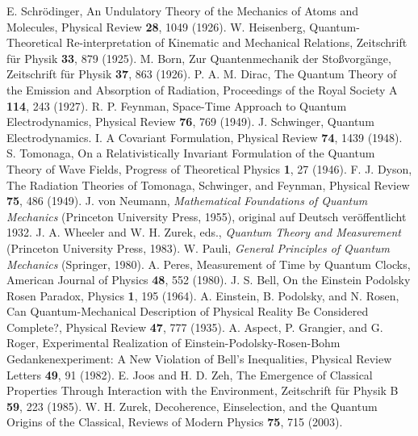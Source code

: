 \documentclass[12pt,a4paper]{article}
\begin{document}
	\begin{thebibliography}{99}
		 E. Schrödinger, An Undulatory Theory of the Mechanics of Atoms and Molecules, Physical Review \textbf{28}, 1049 (1926).
		 W. Heisenberg, Quantum-Theoretical Re-interpretation of Kinematic and Mechanical Relations, Zeitschrift für Physik \textbf{33}, 879 (1925).
		 M. Born, Zur Quantenmechanik der Stoßvorgänge, Zeitschrift für Physik \textbf{37}, 863 (1926).
		 P. A. M. Dirac, The Quantum Theory of the Emission and Absorption of Radiation, Proceedings of the Royal Society A \textbf{114}, 243 (1927).
		 R. P. Feynman, Space-Time Approach to Quantum Electrodynamics, Physical Review \textbf{76}, 769 (1949).
		 J. Schwinger, Quantum Electrodynamics. I. A Covariant Formulation, Physical Review \textbf{74}, 1439 (1948).
		 S. Tomonaga, On a Relativistically Invariant Formulation of the Quantum Theory of Wave Fields, Progress of Theoretical Physics \textbf{1}, 27 (1946).
		 F. J. Dyson, The Radiation Theories of Tomonaga, Schwinger, and Feynman, Physical Review \textbf{75}, 486 (1949).
		 J. von Neumann, \textit{Mathematical Foundations of Quantum Mechanics} (Princeton University Press, 1955), original auf Deutsch veröffentlicht 1932.
		 J. A. Wheeler and W. H. Zurek, eds., \textit{Quantum Theory and Measurement} (Princeton University Press, 1983).
		 W. Pauli, \textit{General Principles of Quantum Mechanics} (Springer, 1980).
		 A. Peres, Measurement of Time by Quantum Clocks, American Journal of Physics \textbf{48}, 552 (1980).
		 J. S. Bell, On the Einstein Podolsky Rosen Paradox, Physics \textbf{1}, 195 (1964).
		 A. Einstein, B. Podolsky, and N. Rosen, Can Quantum-Mechanical Description of Physical Reality Be Considered Complete?, Physical Review \textbf{47}, 777 (1935).
		 A. Aspect, P. Grangier, and G. Roger, Experimental Realization of Einstein-Podolsky-Rosen-Bohm Gedankenexperiment: A New Violation of Bell's Inequalities, Physical Review Letters \textbf{49}, 91 (1982).
		 E. Joos and H. D. Zeh, The Emergence of Classical Properties Through Interaction with the Environment, Zeitschrift für Physik B \textbf{59}, 223 (1985).
		 W. H. Zurek, Decoherence, Einselection, and the Quantum Origins of the Classical, Reviews of Modern Physics \textbf{75}, 715 (2003).

\end{thebibliography}
\end{document}
